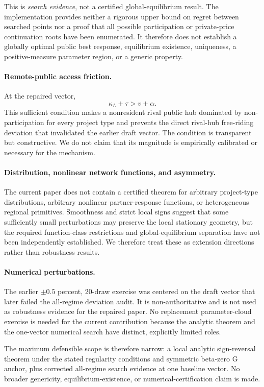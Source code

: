 This is \emph{search evidence}, not a certified global-equilibrium result. The implementation provides neither a rigorous upper bound on regret between searched points nor a proof that all possible participation or private-price continuation roots have been enumerated. It therefore does not establish a globally optimal public best response, equilibrium existence, uniqueness, a positive-measure parameter region, or a generic property.

\paragraph{Remote-public access friction.}
At the repaired vector,
\[
\kappa_L+\tau>v+\alpha.
\]
This sufficient condition makes a nonresident rival public hub dominated by non-participation for every project type and prevents the direct rival-hub free-riding deviation that invalidated the earlier draft vector. The condition is transparent but constructive. We do not claim that its magnitude is empirically calibrated or necessary for the mechanism.

\paragraph{Distribution, nonlinear network functions, and asymmetry.}
The current paper does not contain a certified theorem for arbitrary project-type distributions, arbitrary nonlinear partner-response functions, or heterogeneous regional primitives. Smoothness and strict local signs suggest that some sufficiently small perturbations may preserve the local stationary geometry, but the required function-class restrictions and global-equilibrium separation have not been independently established. We therefore treat these as extension directions rather than robustness results.

\paragraph{Numerical perturbations.}
The earlier $\pm0.5$ percent, 20-draw exercise was centered on the draft vector that later failed the all-regime deviation audit. It is non-authoritative and is not used as robustness evidence for the repaired paper. No replacement parameter-cloud exercise is needed for the current contribution because the analytic theorem and the one-vector numerical search have distinct, explicitly limited roles.

The maximum defensible scope is therefore narrow: a local analytic sign-reversal theorem under the stated regularity conditions and symmetric beta-zero G anchor, plus corrected all-regime search evidence at one baseline vector. No broader genericity, equilibrium-existence, or numerical-certification claim is made.
